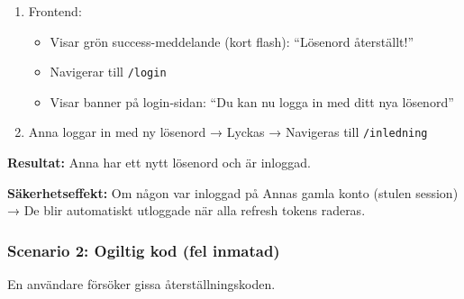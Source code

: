\documentclass[12pt,a4paper]{article}
\begin{document}
\begin{enumerate}[noitemsep]
\begin{itemize}[noitemsep]
  \end{itemize}
  \item Frontend:
  \begin{itemize}[noitemsep]
    \item Visar grön success-meddelande (kort flash): ``Lösenord återställt!''
    \item Navigerar till \texttt{/login}
    \item Visar banner på login-sidan: ``Du kan nu logga in med ditt nya lösenord''
  \end{itemize}
  \item Anna loggar in med ny lösenord → Lyckas → Navigeras till \texttt{/inledning}
\end{enumerate}

\textbf{Resultat:} Anna har ett nytt lösenord och är inloggad.

\textbf{Säkerhetseffekt:} Om någon var inloggad på Annas gamla konto (stulen session) → De blir automatiskt utloggade när alla refresh tokens raderas.

\subsubsection{Scenario 2: Ogiltig kod (fel inmatad)}

En användare försöker gissa återställningskoden.
\end{document}
